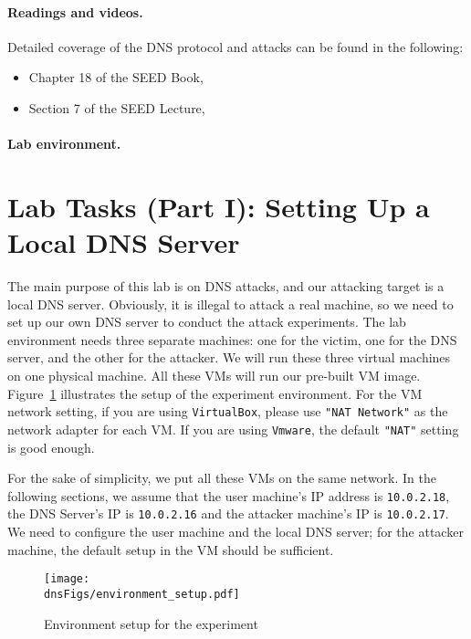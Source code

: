 \paragraph{Readings and videos.}
Detailed coverage of the DNS protocol and attacks can be found in the following:

\begin{itemize}
\item Chapter 18 of the SEED Book, \seedbook
\item Section 7 of the SEED Lecture, \seedisvideo
\end{itemize}



\paragraph{Lab environment.} \seedenvironment



\section{Lab Tasks (Part I): Setting Up a Local DNS Server}

The main purpose of this lab is on DNS attacks, and our attacking target is
a local DNS server.  Obviously, it
is illegal to attack a real machine, so we need to set up our own DNS
server to  conduct the attack experiments. The lab 
environment needs three separate machines:
one for the victim, one for the DNS server, and the other for the attacker.
We will run these three virtual machines on one physical machine.
All these VMs will run our pre-built \ubuntu VM image.
Figure~\ref{dns:fig:environment} illustrates the setup of the experiment environment. 
For the VM network setting, if you
are using {\tt VirtualBox}, please use {\tt "NAT Network"} as the 
network adapter for each VM.  If you are using {\tt Vmware}, the default
{\tt "NAT"} setting is good enough.


For the
sake of simplicity, we put all these VMs on the same network.
In the following sections, we assume that the user machine's IP address is {\tt 10.0.2.18}, the
DNS Server's IP is {\tt 10.0.2.16} and the attacker machine's IP is {\tt 10.0.2.17}.
We need to configure the user machine and the local DNS server; for the
attacker machine, the default setup in the VM should be sufficient.

\begin{figure}[htb]
\centering
\texttt{[image: \\dnsFigs/environment\_setup.pdf]}
\caption{Environment setup for the experiment}
\label{dns:fig:environment}
\end{figure}


